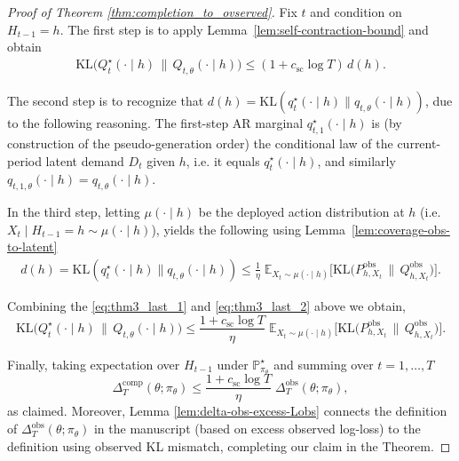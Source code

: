 \documentclass[10pt,a4paper]{amsart}
\renewcommand{\P}{\mathbb{P}}
\begin{document}
\begin{proof}[Proof of Theorem \ref{thm:completion_to_ovserved}]
Fix $t$ and condition on $H_{t-1}=h$. The first step is to apply Lemma~\ref{lem:self-contraction-bound} and obtain
\begin{align}
\label{eq:thm3_last_1}
\mathrm{KL}\big(Q^\star_t(\cdot\mid h)\,\|\,Q_{t,\theta}(\cdot\mid h)\big)
\le (1+c_{\mathrm{sc}}\log T)\, d(h).  
\end{align}


The second step is to recognize that $d(h)=\mathrm{KL}(q_t^\star(\cdot\mid h)\|q_{t,\theta}(\cdot\mid h))$, due to the following reasoning. The first-step AR marginal $q^\star_{t,1}(\cdot\mid h)$ is (by construction of the pseudo-generation order)
the conditional law of the current-period latent demand $D_t$ given $h$, i.e. it equals $q_t^\star(\cdot\mid h)$, and similarly
$q_{t,1,\theta}(\cdot\mid h)=q_{t,\theta}(\cdot\mid h)$. 


In the third step, letting $\mu(\cdot\mid h)$ be the deployed action distribution at $h$ (i.e. $X_t\mid H_{t-1}=h\sim \mu(\cdot\mid h)$), yields the following using Lemma~\ref{lem:coverage-obs-to-latent}
\begin{align}
\label{eq:thm3_last_2}
d(h)=\mathrm{KL}(q_t^\star(\cdot\mid h)\|q_{t,\theta}(\cdot\mid h))
\le \frac{1}{\eta}\;
\mathbb{E}_{X_t\sim \mu(\cdot\mid h)}
\Big[\mathrm{KL}\big(P^{\mathrm{obs}}_{h,X_t}\,\|\,Q^{\mathrm{obs}}_{h,X_t}\big)\Big].
\end{align}

Combining the \eqref{eq:thm3_last_1} and \eqref{eq:thm3_last_2} above we obtain,
\[
\mathrm{KL}\big(Q^\star_t(\cdot\mid h)\,\|\,Q_{t,\theta}(\cdot\mid h)\big)
\le
\frac{1+c_{\mathrm{sc}}\log T}{\eta}\;
\mathbb{E}_{X_t\sim \mu(\cdot\mid h)}
\Big[\mathrm{KL}\big(P^{\mathrm{obs}}_{h,X_t}\,\|\,Q^{\mathrm{obs}}_{h,X_t}\big)\Big].
\]

Finally, taking expectation over $H_{t-1}$ under $\P^\star_{\pi_\theta}$ and summing over $t=1,\dots,T$
\[
\Delta^{\mathrm{comp}}_T(\theta;\pi_\theta)
\le
\frac{1+c_{\mathrm{sc}}\log T}{\eta}\;
\Delta^{\mathrm{obs}}_T(\theta;\pi_\theta),
\]
as claimed. Moreover, Lemma \ref{lem:delta-obs-excess-Lobs} connects the definition of $\Delta^{\mathrm{obs}}_T(\theta;\pi_\theta)$ in the manuscript (based on excess observed log-loss) to the definition using observed KL mismatch, completing our claim in the Theorem.
\end{proof}
\end{document}
